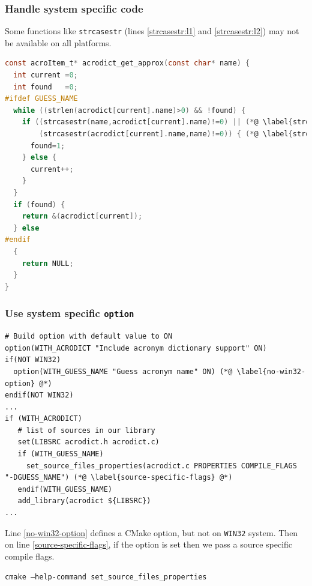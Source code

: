 \documentclass[compress,slidestop,table,usepdftitle=false
              ]
               {beamer}
\begin{document}
\begin{frame}[fragile]
\frametitle{Handle system specific code}
Some functions like \lstinline[language=C]!strcasestr!
(lines \ref{strcasestr:l1} and \ref{strcasestr:l2}) may not be available
on all platforms.
\begin{lstlisting}[language=C,basicstyle=\tiny,xleftmargin=1cm,xrightmargin=1cm,caption=excerpt from acrodict.c]
const acroItem_t* acrodict_get_approx(const char* name) {
  int current =0;
  int found   =0;
#ifdef GUESS_NAME
  while ((strlen(acrodict[current].name)>0) && !found) {
    if ((strcasestr(name,acrodict[current].name)!=0) || (*@ \label{strcasestr:l1} @*)
        (strcasestr(acrodict[current].name,name)!=0)) { (*@ \label{strcasestr:l2} @*)
      found=1;
    } else {
      current++;
    }
  }
  if (found) {
    return &(acrodict[current]);
  } else
#endif
  {
    return NULL;
  }
}
\end{lstlisting}
\end{frame}

\begin{frame}[fragile]
\frametitle{Use system specific \lstinline!option!}
\begin{lstlisting}[basicstyle=\tiny]
# Build option with default value to ON
option(WITH_ACRODICT "Include acronym dictionary support" ON)
if(NOT WIN32)
  option(WITH_GUESS_NAME "Guess acronym name" ON) (*@ \label{no-win32-option} @*)
endif(NOT WIN32)
...
if (WITH_ACRODICT)
   # list of sources in our library
   set(LIBSRC acrodict.h acrodict.c)
   if (WITH_GUESS_NAME)
     set_source_files_properties(acrodict.c PROPERTIES COMPILE_FLAGS "-DGUESS_NAME") (*@ \label{source-specific-flags} @*)
   endif(WITH_GUESS_NAME)
   add_library(acrodict ${LIBSRC})
...
\end{lstlisting}
Line \ref{no-win32-option} defines a CMake option, but not on \lstinline!WIN32! system.
Then on line \ref{source-specific-flags}, if the option is set then we pass a source specific compile flags.

\texttt{cmake --help-command set\_source\_files\_properties}
\end{frame}
\end{document}
